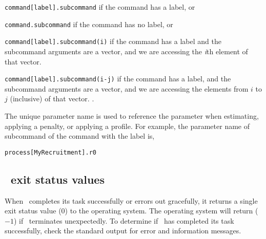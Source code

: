 \begin{description}
\item \texttt{command[label].subcommand} if the command has a label, or
\item \texttt{command.subcommand} if the command has no label, or
\item \texttt{command[label].subcommand(i)} if the command has a label and the subcommand arguments are a vector, and we are accessing the  \emph{i}th element of that vector. 
\item \texttt{command[label].subcommand(i-j)} if the command has a label, and the subcommand arguments are a vector, and we are accessing the elements from $i$ to $j$ (inclusive) of that vector. \NYI.
\end{description} 

The unique parameter name is used to reference the parameter when estimating, applying a penalty, or applying a profile. For example, the parameter name of subcommand  of the command  with the label  is,

\texttt{process[MyRecruitment].r0}

\subsection{\SPM\ exit status values}

When \SPM\ completes its task successfully or errors out gracefully, it returns a single exit status value ($0$) to the operating system. The operating system will return ($-1$) if \SPM\ terminates unexpectedly. To determine if \SPM\ has completed its task successfully, check the standard output for error and information messages.
